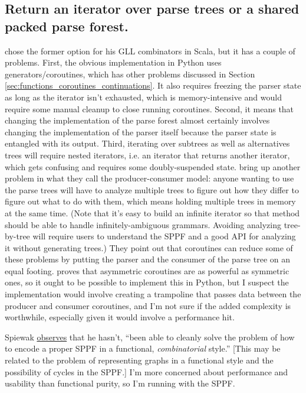 \documentclass[12pt]{article}
\begin{document}
\subsection{Return an iterator over parse trees or a shared packed
  parse forest.}
\label{sec:iterator_sppf}

\textcite{spiewak} chose the former option for his GLL combinators in
Scala, but it has a couple of problems.  First, the obvious
implementation in Python uses generators/coroutines, which has other
problems discussed in Section
\ref{sec:functions_coroutines_continuations}.  It also requires
freezing the parser state as long as the iterator isn't exhausted,
which is memory-intensive and would require some manual cleanup to
close running coroutines.  Second, it means that changing the
implementation of the parse forest almost certainly involves changing
the implementation of the parser itself because the parser state is
entangled with its output.  Third, iterating over subtrees as well as
alternatives trees will require nested iterators, i.e. an iterator
that returns another iterator, which gets confusing and requires some
doubly-suspended state.  \textcite{grune_jacobs} bring up another
problem in what they call the producer-consumer model: anyone wanting
to use the parse trees will have to analyze multiple trees to figure
out how they differ to figure out what to do with them, which means
holding multiple trees in memory at the same time.  (Note that it's
easy to build an infinite iterator so that method should be able to
handle infinitely-ambiguous grammars.  Avoiding analyzing tree-by-tree
will require users to understand the SPPF and a good API for analyzing
it without generating trees.)  They point out that coroutines can
reduce some of these problems by putting the parser and the consumer
of the parse tree on an equal footing.  \textcite{moura_ierusalimschy}
proves that asymmetric coroutines are as powerful as symmetric ones,
so it ought to be possible to implement this in Python, but I suspect
the implementation would involve creating a trampoline that passes
data between the producer and consumer coroutines, and I'm not sure if
the added complexity is worthwhile, especially given it would involve
a performance hit.

Spiewak
\href{https://github.com/djspiewak/gll-combinators/issues/24#issuecomment-59147169}{observes}
that he hasn't, ``been able to cleanly solve the problem of how to
encode a proper SPPF in a functional, \emph{combinatorial} style.''
[This may be related to the problem of representing graphs in a
functional style and the possibility of cycles in the SPPF.]  I'm more
concerned about performance and usability than functional purity, so
I'm running with the SPPF.
\end{document}
